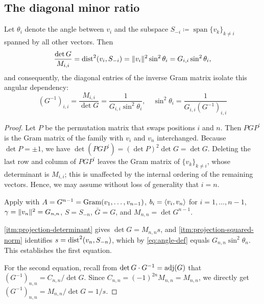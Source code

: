 \documentclass{IEEEtran}
\begin{document}
\subsection{The diagonal minor ratio}

\begin{proposition}
  \label{prop:minor-angle}
  Let $\theta_{i}$ denote the angle between $v_{i}$ and the subspace $S_{-i} \coloneq \operatorname{span}\{v_{k}\}_{k \neq i}$ spanned by all other vectors. Then
  \begin{equation}
    \frac{\det G}{M_{i,i}}
    = \dist^{2}(v_{i}, S_{-i})
    = \norm{v_{i}}^{2} \sin^{2}\theta_{i}
    = G_{i,i}\sin^{2}\theta_{i} ,
    \label{eq:minor-angle}
  \end{equation}
  and consequently, the diagonal entries of the inverse Gram matrix isolate this angular dependency:
  \begin{equation}
    (G^{-1})_{i,i} = \frac{M_{i,i}}{\det G}
    = \frac{1}{G_{i,i}\sin^{2}\theta_{i}},
    \quad
    \sin^{2}\theta_{i} = \frac{1}{G_{i,i}(G^{-1})_{i,i}}
    \label{eq:inverse-entry}
  \end{equation}
\end{proposition}

\begin{proof}
  Let $P$ be the permutation matrix that swaps positions $i$ and $n$. Then $PGP^{\prime}$ is the Gram matrix of the family with $v_{i}$ and $v_{n}$ interchanged. Because $\det P = \pm 1$, we have $\det(PGP^{\prime}) = (\det P)^{2} \det G = \det G$. Deleting the last row and column of $PGP^{\prime}$ leaves the Gram matrix of $\{v_{k}\}_{k \neq i}$, whose determinant is $M_{i,i}$; this is unaffected by the internal ordering of the remaining vectors. Hence, we may assume without loss of generality that $i = n$.

  Apply  with $A = G^{n-1} = \gram(v_{1},\ldots,v_{n-1})$, $b_{i} = \inner{v_{i}, v_{n}}$ for $i = 1, \ldots, n-1$, $\gamma = \norm{v_{n}}^{2} = G_{n,n}$, $S = S_{-n}$, $\bar{G} = G$, and $M_{n,n} = \det G^{n-1}$.

  \ref{itm:projection-determinant} gives $\det G = M_{n,n}  s$, and \ref{itm:projection-squared-norm} identifies $s = \dist^{2}(v_{n}, S_{-n})$, which by \eqref{eq:angle-def} equals $G_{n,n}\sin^{2}\theta_{n}$. This establishes the first equation.

  For the second equation, recall from $\det G \cdot G^{-1} = \adj(G)$ that $(G^{-1})_{n,n} = C_{n,n} / \det G$. Since $C_{n,n} = (-1)^{2n} M_{n,n} = M_{n,n}$, we directly get $(G^{-1})_{n,n} = M_{n,n}/\det G = 1/s$.
\end{proof}
\end{document}
